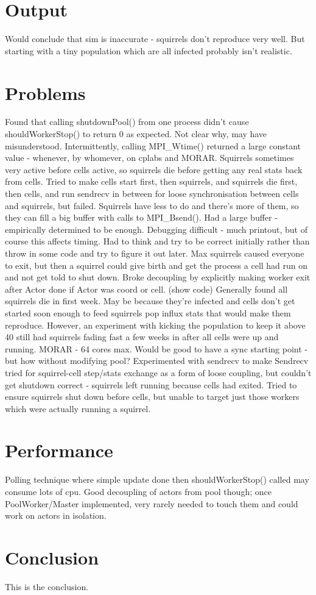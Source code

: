 \documentclass[11pt, oneside]{article}   %
\begin{document}
\section{Output}
Would conclude that sim is inaccurate - squirrels don't reproduce very well.
But starting with a tiny population which are all infected probably isn't realistic.

\section{Problems}
Found that calling shutdownPool() from one process didn't cause shouldWorkerStop() to return 0 as expected.
Not clear why, may have misunderstood.
Intermittently, calling MPI\_Wtime() returned a large constant value - whenever, by whomever, on cplabs and MORAR.
Squirrels sometimes very active before cells active, so squirrels die before getting any real stats back from cells.
Tried to make cells start first, then squirrels, and squirrels die first, then cells, and run sendrecv in between for loose synchronisation between cells and squirrels, but failed.
Squirrels have less to do and there's more of them, so they can fill a big buffer with calls to MPI\_Bsend().
Had a large buffer - empirically determined to be enough.
Debugging difficult - much printout, but of course this affects timing.
Had to think and try to be correct initially rather than throw in some code and try to figure it out later.
Max squirrels caused everyone to exit, but then a squirrel could give birth and get the process a cell had run on and not get told to shut down.
Broke decoupling by explicitly making worker exit after Actor done if Actor was coord or cell. (show code)
Generally found all squirrels die in first week.  May be because they're infected and cells don't get started soon enough to feed squirrels pop influx stats that would make them reproduce.
However, an experiment with kicking the population to keep it above 40 still had squirrels fading fast a few weeks in after all cells were up and running.
MORAR - 64 cores max.
Would be good to have a sync starting point - but how without modifying pool?
Experimented with sendrecv to make 
Sendrecv tried for squirrel-cell step/stats exchange as a form of loose coupling, but couldn't get shutdown correct - squirrels left running because cells had exited.
Tried to ensure squirrels shut down before cells, but unable to target just those workers which were actually running a squirrel.

\section{Performance}
Polling technique where simple update done then shouldWorkerStop() called may consume lots of cpu.
Good decoupling of actors from pool though; once PoolWorker/Master implemented, very rarely needed to touch them and could work on actors in isolation.



\newpage
\newpage
\section{Conclusion}
This is the conclusion.
\end{document}
